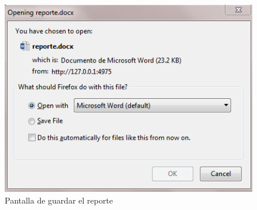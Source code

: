 \begin{figure}[H]
\centering
\includegraphics[scale=0.6]{reporte3.PNG}
\caption{Pantalla de guardar el reporte}
\end{figure}









    

